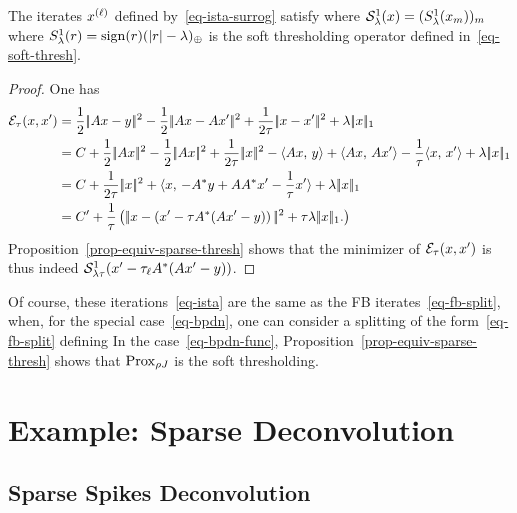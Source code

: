 \begin{prop}
	The iterates $\it{x}$ defined by~\eqref{eq-ista-surrog} satisfy
	where $\Ss^1_\la(x) = (  S^1_\la(x_m) )_m$ where $S^1_\la(r) = \sign(r) (|r|-\la)_\oplus$ is the soft thresholding operator defined in~\eqref{eq-soft-thresh}. 
\end{prop}
\begin{proof}
	One has 
	\begin{align*}
		\Ee_\tau(x,x') &= \frac{1}{2}\norm{Ax-y}^2 - \frac{1}{2}\norm{Ax-Ax'}^2 + \frac{1}{2\tau}\norm{x-x'}^2 + \la \norm{x}_1 \\
			& = C + \frac{1}{2}\norm{Ax}^2-\frac{1}{2}\norm{Ax}^2+\frac{1}{2\tau}\norm{x}^2
			- \dotp{Ax}{y} + \dotp{Ax}{Ax'} - \frac{1}{\tau}\dotp{x}{x'}
			+ \la \norm{x}_1 \\
			& = C + \frac{1}{2\tau}\norm{x}^2 + \dotp{x}{ -A^*y+AA^*x'-\frac{1}{\tau}x' } + \la \norm{x}_1 \\
			&= C' + \frac{1}{\tau} \pa{
				\norm{ x - \pa{ x'-\tau A^*(Ax'-y) } }^2 + \tau \la \norm{x}_1.
			}
	\end{align*}
	Proposition~\eqref{prop-equiv-sparse-thresh} shows that the minimizer of $\Ee_\tau(x,x')$ is thus 
	indeed $\Ss^1_{\la\tau}( x' - \tau_\ell A^*( A x' - y ) )$.
\end{proof}

Of course, these iterations~\eqref{eq-ista} are the same as the FB iterates~\eqref{eq-fb-split}, when, for the special case~\eqref{eq-bpdn}, one can consider a splitting of the form~\eqref{eq-fb-split} defining
%
In the case~\eqref{eq-bpdn-func}, Proposition~\eqref{prop-equiv-sparse-thresh} shows that $\Prox_{\rho J}$ is the soft thresholding.



\section{Example: Sparse Deconvolution}


\subsection{Sparse Spikes Deconvolution}

